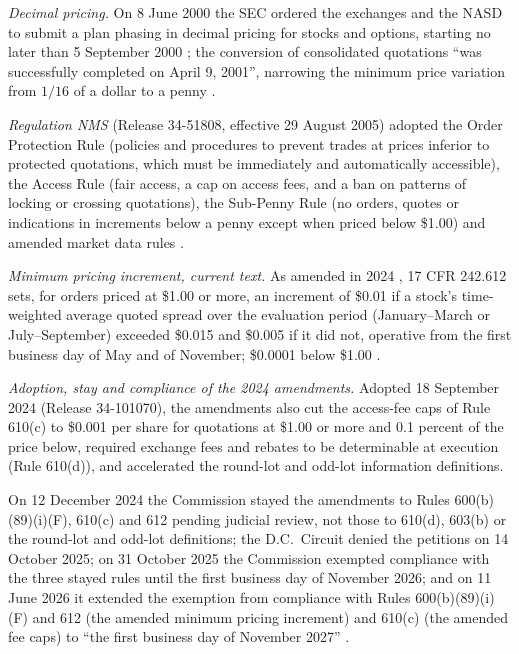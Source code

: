 \begin{qfrule}\label{rule:us-equity-market-structure}
 \emph{Decimal pricing.} On 8 June 2000 the SEC ordered the exchanges and the NASD to submit a plan phasing in decimal pricing for stocks and options, starting no later than 5 September 2000 \citep[Release 34-42914]{sec-34-42914}; the conversion of consolidated quotations ``was successfully completed on April 9, 2001'', narrowing the minimum price variation from $1/16$ of a dollar to a penny \citep[Release 34-44568, p.~38390]{sec-34-44568}.

\emph{Regulation NMS} (Release 34-51808, effective 29 August 2005) adopted the Order Protection Rule (policies and procedures to prevent trades at prices inferior to protected quotations, which must be immediately and automatically accessible), the Access Rule (fair access, a cap on access fees, and a ban on patterns of locking or crossing quotations), the Sub-Penny Rule (no orders, quotes or indications in increments below a penny except when priced below \$1.00) and amended market data rules \citep[p.~37496]{sec-34-51808}.

\emph{Minimum pricing increment, current text.} As amended in 2024 \citep[Release 34-101070, catalogue entry]{ex-sec-tick-access-2024}, 17 CFR 242.612 sets, for orders priced at \$1.00 or more, an increment of \$0.01 if a stock's time-weighted average quoted spread over the evaluation period (January--March or July--September) exceeded \$0.015 and \$0.005 if it did not, operative from the first business day of May and of November; \$0.0001 below \$1.00 \citep[text for 14 October 2026]{cfr-242-612}.

 \emph{Adoption, stay and compliance of the 2024 amendments.} Adopted 18 September 2024 (Release 34-101070), the amendments also cut the access-fee caps of Rule 610(c) to \$0.001 per share for quotations at \$1.00 or more and 0.1 percent of the price below, required exchange fees and rebates to be determinable at execution (Rule 610(d)), and accelerated the round-lot and odd-lot information definitions.

On 12 December 2024 the Commission stayed the amendments to Rules 600(b)(89)(i)(F), 610(c) and 612 pending judicial review, not those to 610(d), 603(b) or the round-lot and odd-lot definitions; the D.C.\ Circuit denied the petitions on 14 October 2025; on 31 October 2025 the Commission exempted compliance with the three stayed rules until the first business day of November 2026; and on 11 June 2026 it extended the exemption from compliance with Rules 600(b)(89)(i)(F) and 612 (the amended minimum pricing increment) and 610(c) (the amended fee caps) to ``the first business day of November 2027'' \citep[91~FR 36022--36024]{sec-34-105656}.


\end{qfrule}
